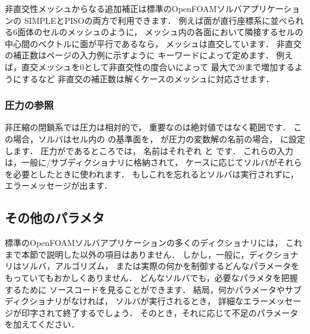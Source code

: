 非直交性メッシュからなる追加補正は標準のOpenFOAMソルバアプリケーションの
SIMPLEとPISOの両方で利用できます．
例えば面が直行座標系に並べられる6面体のセルのメッシュのように，
メッシュ内の各面において隣接するセルの中心間のベクトルに面が平行であるなら，
メッシュは直交しています．
非直交の補正数は\pageref{p:U-117}ページの入力例に示すように
キーワードによって定めます．
例えば，直交メッシュを$0$として非直交性の度合いによって
最大で$20$まで増加するようにするなど
非直交の補正数は解くケースのメッシュに対応させます．

\subsubsection{圧力の参照}
\label{sssec:4.5.3.1}
非圧縮の閉鎖系では圧力は相対的で，
重要なのは絶対値ではなく範囲です．
この場合，ソルバはセル内の
%
%
の基準面を，
が圧力の変数解の名前の場合，
%
%
に設定します．
圧力がであるところでは，
名前はそれぞれ
%
%
と
%
%
です．
これらの入力は，一般に/サブディクショナリに格納されて，
ケースに応じてソルバがそれらを必要としたときに使われます．
もしこれを忘れるとソルバは実行されずに，エラーメッセージが出ます．


\subsection{その他のパラメタ}
\label{ssec:4.5.4}
標準のOpenFOAMソルバアプリケーションの多くのディクショナリには，
これまで本節で説明した以外の項目はありません．
しかし，一般に，ディクショナリはソルバ，アルゴリズム，
または実際の何かを制御するどんなパラメータをもっていてもおかしくありません．
どんなソルバでも，必要なパラメタを把握するために
ソースコードを見ることができます．
結局，何かパラメータやサブディクショナリがなければ，
ソルバが実行されるとき，
詳細なエラーメッセージが印字されて終了するでしょう．
そのとき，それに応じて不足のパラメータを加えてください．

